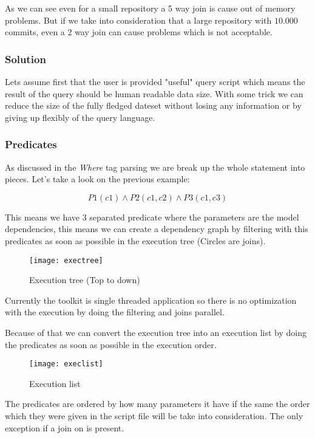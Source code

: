 As we can see even for a small repository a 5 way join is cause out of memory problems. But if we take into consideration that a large repository with $10.000$ commits, even a 2 way join can cause problems which is not acceptable. 
\newpage

\subsubsection{Solution}

Lets assume first that the user is provided "useful" query script which means the result of the query should be human readable data size. With some trick we can reduce the size of the fully fledged dateset without losing any information or by giving up flexibly of the query language. 

\subsubsection{Predicates}

As discussed in the \textit{Where} tag parsing we are break up the whole statement into pieces. Let's take a look on the previous example:

\[ P1(c1) \wedge P2(c1,c2) \wedge P3(c1,c3)\]

This means we have 3 separated predicate where the parameters are the model dependencies, this means we can create a dependency graph by filtering with this predicates as soon as possible  in the execution tree (Circles are joins).

 \begin{figure}[H]
	\centering
	\texttt{[image: exectree]}
	\caption{Execution tree (Top to down)}
	\label{fig:fig-elist}
\end{figure}

\newpage

Currently the toolkit is single threaded application so there is no optimization with the execution by doing the filtering and joins parallel.

Because of that we can convert the execution tree into an execution list by doing the predicates as soon as possible in the execution order.

 \begin{figure}[H]
	\centering
	\texttt{[image: execlist]}
	\caption{Execution list}
	\label{fig:fig-liste}
\end{figure}

The predicates are ordered by how many parameters it have if the same the order which they were given in the script file will be take into consideration. The only exception if a join on is present.

